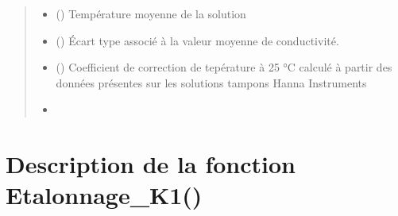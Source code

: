 \documentclass[letterpaper,10pt,french]{sphinxmanual}
\begin{document}
\begin{fulllineitems}
\begin{quote}
\begin{description}
\begin{itemize}
\item {} 
\sphinxAtStartPar
{} () \textendash{} Température moyenne de la solution

\item {} 
\sphinxAtStartPar
{} () \textendash{} Écart type associé à la valeur moyenne de conductivité.

\item {} 
\sphinxAtStartPar
{} () \textendash{} Coefficient de correction de tepérature à 25 °C calculé à partir des données présentes sur les solutions tampons Hanna Instruments

\item {} 
\sphinxAtStartPar
\sphinxstyleliteralstrong{\sphinxupquote{\sphinxhyphen{}\sphinxhyphen{}\sphinxhyphen{}\sphinxhyphen{}\sphinxhyphen{}\sphinxhyphen{}\sphinxhyphen{}}} \textendash{} 

\end{itemize}

\end{description}\end{quote}

\end{fulllineitems}



\section{Description de la fonction Etalonnage\_K1()}
\label{\detokenize{Documentation:description-de-la-fonction-etalonnage-k1}}
\end{document}
